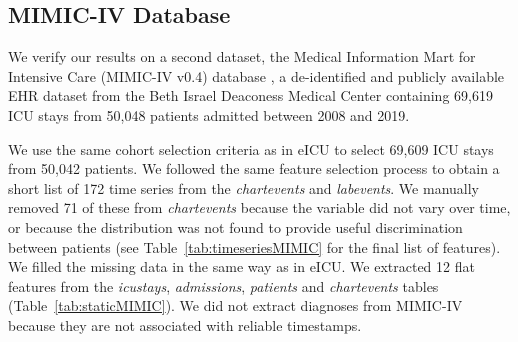 \documentclass[sigconf]{acmart}
\begin{document}
\subsection{MIMIC-IV Database}

We verify our results on a second dataset, the Medical Information Mart for Intensive Care (MIMIC-IV v0.4) database \cite{johnson}, a de-identified and publicly available EHR dataset from the Beth Israel Deaconess Medical Center containing 69,619 ICU stays from 50,048 patients admitted between 2008 and 2019.

We use the same cohort selection criteria as in eICU to select 69,609 ICU stays from 50,042 patients. We followed the same feature selection process to obtain a short list of 172 time series from the \textit{chartevents} and \textit{labevents}. We manually removed 71 of these from \textit{chartevents} because the variable did not vary over time, or because the distribution was not found to provide useful discrimination between patients (see Table~\ref{tab:timeseriesMIMIC} for the final list of features). We filled the missing data in the same way as in eICU. We extracted 12 flat features from the \textit{icustays}, \textit{admissions}, \textit{patients} and \textit{chartevents} tables (Table~\ref{tab:staticMIMIC}). We did not extract diagnoses from MIMIC-IV because they are not associated with reliable timestamps.
\end{document}
